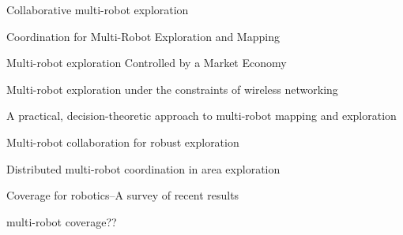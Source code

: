 Collaborative multi-robot exploration
\cite{burgard2000collaborative}

Coordination for Multi-Robot Exploration and Mapping
\cite{simmons2000coordination}

Multi-robot exploration Controlled by a Market Economy
\cite{zlot2002multi}

Multi-robot exploration under the constraints of wireless networking
\cite{rooker2007multi}

A practical, decision-theoretic approach to multi-robot mapping and exploration
\cite{ko2003practical}

Multi-robot collaboration for robust exploration
\cite{rekleitis2001multi}

Distributed multi-robot coordination in area exploration
\cite{sheng2006distributed}

Coverage for robotics–A survey of recent results

multi-robot coverage??